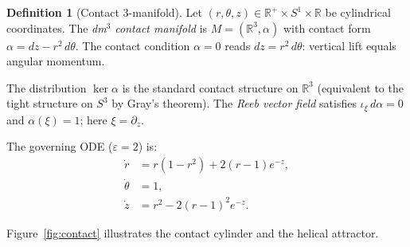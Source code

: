 \documentclass[12pt,a4paper]{article}
\theoremstyle{plain}
\theoremstyle{definition}
\newtheorem{definition}[theorem]{Definition}
\theoremstyle{remark}
\newcommand{\eps}{\varepsilon}
\begin{document}
\begin{definition}[Contact 3-manifold]
Let $(r,\theta,z)\in\mathbb{R}^+\times S^1\times\mathbb{R}$ be cylindrical
coordinates.
The \emph{dm$^3$ contact manifold} is $M=(\mathbb{R}^3,\alpha)$ with contact form
$\alpha = dz - r^2\,d\theta$.
The contact condition $\alpha=0$ reads $dz=r^2\,d\theta$:
vertical lift equals angular momentum.
\end{definition}

The distribution $\ker\alpha$ is the standard contact structure on $\mathbb{R}^3$
(equivalent to the tight structure on $S^3$ by Gray's theorem).
The \emph{Reeb vector field} satisfies $\iota_\xi\,d\alpha=0$ and $\alpha(\xi)=1$;
here $\xi=\partial_z$.

The governing ODE ($\eps=2$) is:
\begin{align}
  \dot r &= r(1-r^2)+2(r-1)e^{-z}, \label{eq:r}\\
  \dot\theta &= 1, \label{eq:th}\\
  \dot z &= r^2-2(r-1)^2e^{-z}. \label{eq:z}
\end{align}

\noindent Figure~\ref{fig:contact} illustrates the contact cylinder and the
helical attractor.
\end{document}
